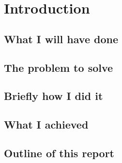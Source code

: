 \chapter{Introduction}
  \section{What I will have done}
  
  \section{The problem to solve}
  
  \section{Briefly how I did it}

  \section{What I achieved}

  \section{Outline of this report}